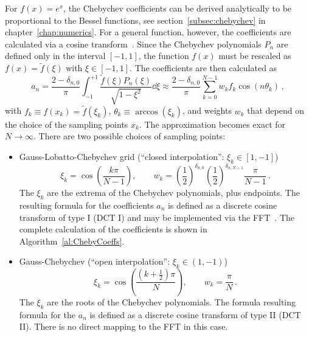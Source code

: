 For $f(x) = e^{x}$, the Chebychev coefficients can be derived analytically
to be proportional to the Bessel functions, see
section~\ref{subsec:chebychev} in chapter~\ref{chap:numerics}. For a general
function, however, the coefficients are calculated via a cosine
transform~\cite{NdongJCP09}. Since the Chebychev polynomials $P_n$ are defined
only in the interval $[-1, 1]$, the function $f(x)$ must be rescaled as $f(x)
= \tilde{f}(\xi)$ with $\xi \in [-1,1]$. The coefficients are then calculated as
\begin{equation}
  a_n = \frac{2 - \delta_{n,0}}{\pi}
        \int_{-1}^{+1} \frac{\tilde{f}(\xi) P_n(\xi)}{\sqrt{1-\xi^2}} \dd \xi
      \approx \frac{2 - \delta_{n,0}}{\pi}
        \sum_{k=0}^{N-1} w_k f_k \cos\left( n \theta_k \right)\,,
\end{equation}
with $f_k \equiv f(x_k) = \tilde{f}(\xi_k)$, $\theta_k \equiv \arccos(\xi_k)$,
and weights $w_k$ that depend on the choice of the sampling points $x_k$.
The approximation becomes exact for $N \rightarrow \infty$.
There are two possible choices of sampling points:
\begin{itemize}

  \item Gauss-Lobatto-Chebychev grid
        (``closed interpolation'': $\xi_k \in [1, -1]$)
  \begin{equation}
    \xi_k = \cos\left( \frac{k \pi}{N-1}
                \right), \qquad
    w_k = \left(\frac{1}{2}\right)^{\delta_{n,0}}
          \left(\frac{1}{2}\right)^{\delta_{n,N-1}}
          \frac{\pi}{N-1}\,.
    \label{eq:gauss_lobatto}
  \end{equation}
  The $\xi_k$ are the extrema of the Chebychev polynomials, plus
  endpoints. The resulting formula for the coefficients $a_n$ is defined as
  a discrete cosine transform of type I (DCT I) and may be implemented via the
  FFT~\cite{RaoDCTBook1990}. The complete calculation of the coefficients is
  shown in Algorithm~\ref{al:ChebyCoeffs}.

  \item Gauss-Chebychev (``open interpolation'': $\xi_k \in (1, -1)$)
  \begin{equation}
    \xi_k = \cos\left( \frac{\left(k + \frac{1}{2}\right) \pi}{N}
                \right), \qquad
    w_k = \frac{\pi}{N}\,.
    \label{eq:gauss_cheby}
  \end{equation}
  The $\xi_k$ are the roots of the Chebychev polynomials. The formula resulting
  formula for the $a_n$ is defined as a discrete cosine transform of type II
  (DCT II). There is no direct mapping to the FFT in this case.
\end{itemize}

